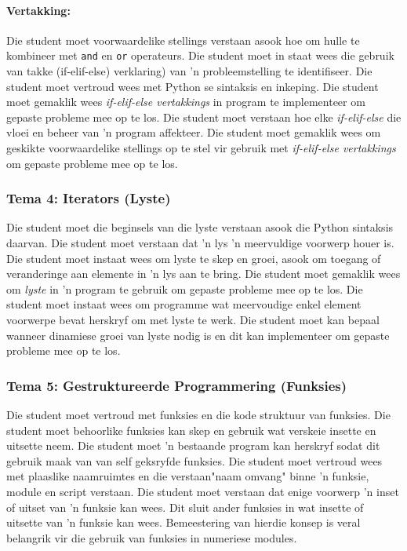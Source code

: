             \paragraph{Vertakking:}
		Die student moet voorwaardelike stellings verstaan asook hoe
             om hulle te kombineer met \texttt {and} en \texttt{or} 
             operateurs. Die student moet in staat wees die 
             gebruik van takke (if-elif-else)
             verklaring) van 'n probleemstelling te identifiseer. Die student moet vertroud wees met Python se  
             sintaksis en inkeping. Die student moet gemaklik wees 
             \textit {if-elif-else vertakkings} in program te implementeer om gepaste probleme mee op te los. 
	   Die student moet verstaan ​​hoe elke \textit{if-elif-else} die vloei en beheer van 'n program affekteer.	
	  Die student moet gemaklik wees om geskikte voorwaardelike stellings op te stel vir gebruik met
	    \textit{if-elif-else vertakkings} om gepaste probleme mee op te los.
            
	\subsubsection {Tema 4: Iterators (Lyste)} 
         Die student moet die beginsels van die lyste verstaan asook die Python sintaksis daarvan. 
	Die student moet verstaan dat 'n lys 'n meervuldige voorwerp houer is. Die student moet instaat
	wees om lyste te skep en groei, asook om toegang of veranderinge aan elemente in 'n lys aan te
	bring. Die student moet gemaklik wees om \textit{lyste} in 'n program te gebruik om gepaste probleme 	mee op te los. Die student moet instaat wees om programme wat meervoudige enkel element 	 
	voorwerpe bevat herskryf om met lyste te werk. Die student moet kan bepaal wanneer dinamiese
	groei van lyste nodig is en dit kan implementeer om gepaste probleme mee op te los.

	\subsubsection {Tema 5: Gestruktureerde Programmering (Funksies)} 
        Die student moet vertroud met funksies en die kode struktuur van funksies. 
	Die student moet behoorlike funksies kan skep en 
         gebruik wat verskeie insette en uitsette neem. Die student 
        moet  'n bestaande program kan herskryf sodat dit gebruik maak van van self geksryfde funksies. 
	Die student moet vertroud wees 
        met plaaslike naamruimtes en die verstaan ​​"naam omvang" binne 'n 
        funksie, module en script verstaan. Die student moet verstaan dat enige
        voorwerp 'n inset of uitset van 'n funksie kan wees. Dit sluit ander funksies in wat insette of uitsette 
	van 'n funksie kan wees. Bemeestering van hierdie konsep is veral belangrik vir die gebruik van funksies in 
	numeriese modules. 

